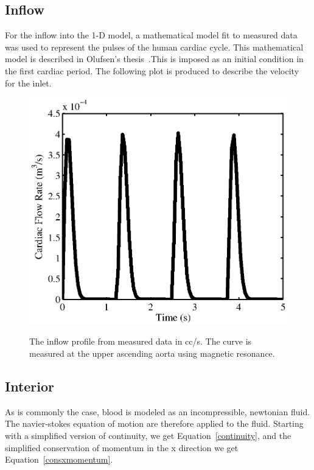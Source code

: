 \documentclass[12pt]{article}
\begin{document}
\subsection{Inflow}

For the inflow into the 1-D model, a mathematical model fit to measured data was used to represent the pulses of the human cardiac cycle. This mathematical model is described in Olufsen's thesis~\cite{olufsenthesis}.This is imposed as an initial condition in the first cardiac period. The following plot is produced to describe the velocity for the inlet.

\begin{figure}[ht]
	\centering
	\includegraphics{inflow}
	\label{inflower}
	\caption{The inflow profile from measured data in cc/s. The curve is measured at the upper ascending aorta using magnetic resonance.}
\end{figure}


\subsection{Interior}
As is commonly the case, blood is modeled as an incompressible, newtonian fluid. The navier-stokes equation of motion are therefore applied to the fluid. Starting with a simplified version of continuity, we get Equation~\eqref{continuity}, and the simplified conservation of momentum in the x direction we get Equation~\eqref{consxmomentum}.
\end{document}
